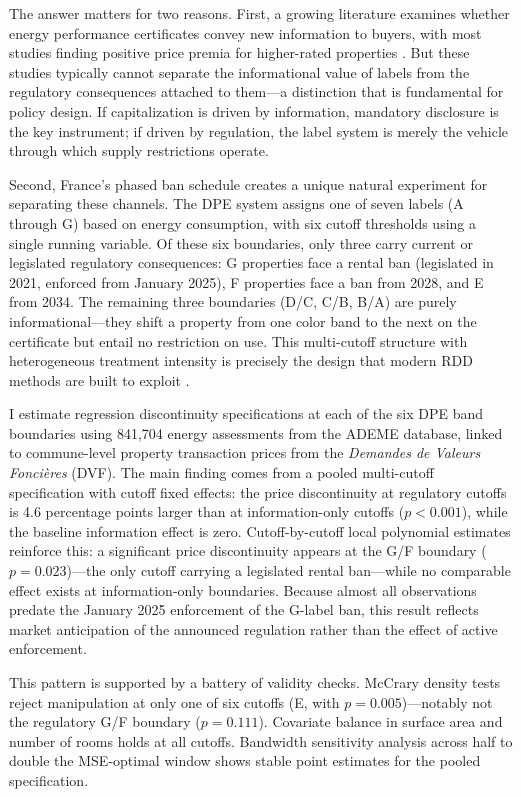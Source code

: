 \documentclass[12pt]{article}
\begin{document}
The answer matters for two reasons. First, a growing literature examines whether energy performance certificates convey new information to buyers, with most studies finding positive price premia for higher-rated properties \citep{fuerst2015does, hyland2013value, sejas2025epc}. But these studies typically cannot separate the informational value of labels from the regulatory consequences attached to them---a distinction that is fundamental for policy design. If capitalization is driven by information, mandatory disclosure is the key instrument; if driven by regulation, the label system is merely the vehicle through which supply restrictions operate.

Second, France's phased ban schedule creates a unique natural experiment for separating these channels. The DPE system assigns one of seven labels (A through G) based on energy consumption, with six cutoff thresholds using a single running variable. Of these six boundaries, only three carry current or legislated regulatory consequences: G properties face a rental ban (legislated in 2021, enforced from January 2025), F properties face a ban from 2028, and E from 2034. The remaining three boundaries (D/C, C/B, B/A) are purely informational---they shift a property from one color band to the next on the certificate but entail no restriction on use. This multi-cutoff structure with heterogeneous treatment intensity is precisely the design that modern RDD methods are built to exploit \citep{cattaneo2019rdr, cattaneo2024rdr2}.

I estimate regression discontinuity specifications at each of the six DPE band boundaries using 841,704 energy assessments from the ADEME database, linked to commune-level property transaction prices from the \textit{Demandes de Valeurs Fonci\`eres} (DVF). The main finding comes from a pooled multi-cutoff specification with cutoff fixed effects: the price discontinuity at regulatory cutoffs is 4.6 percentage points larger than at information-only cutoffs ($p<0.001$), while the baseline information effect is zero. Cutoff-by-cutoff local polynomial estimates reinforce this: a significant price discontinuity appears at the G/F boundary ($p = 0.023$)---the only cutoff carrying a legislated rental ban---while no comparable effect exists at information-only boundaries. Because almost all observations predate the January 2025 enforcement of the G-label ban, this result reflects market anticipation of the announced regulation rather than the effect of active enforcement.

This pattern is supported by a battery of validity checks. McCrary density tests \citep{cattaneo2020rdrobust} reject manipulation at only one of six cutoffs (E, with $p=0.005$)---notably not the regulatory G/F boundary ($p=0.111$). Covariate balance in surface area and number of rooms holds at all cutoffs. Bandwidth sensitivity analysis across half to double the MSE-optimal window shows stable point estimates for the pooled specification.
\end{document}

